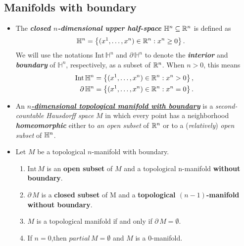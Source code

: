 \documentclass[11pt]{article}
\begin{document}
\subsection{Manifolds with boundary}
\begin{itemize}
\item \begin{definition}
The \emph{\textbf{closed $n$-dimensional upper half-space}} $\mathbb{H}^n \subseteq {\mathbb R}^n$ is defined as
\begin{align*}
\mathbb{H}^n &= \left\{(x^1, \ldots, x^n) \in {\mathbb R}^n: x^n \ge 0\right\}. 
\end{align*} We will use the notations $\text{Int}\, \mathbb{H}^n$ and $\partial\, \mathbb{H}^n$ to denote the \emph{\textbf{interior}} and \emph{\textbf{boundary}} of $\mathbb{H}^n$, respectively, as a subset of ${\mathbb R}^n$. When $n > 0$, this means
\begin{align*}
\text{Int}\, \mathbb{H}^n &= \left\{(x^1, \ldots, x^n) \in {\mathbb R}^n: x^n > 0\right\}, \\
\partial\, \mathbb{H}^n &= \left\{(x^1, \ldots, x^n) \in {\mathbb R}^n: x^n = 0\right\}.
\end{align*}
\end{definition}

\item 
\begin{definition}
An \underline{\emph{\textbf{$n$-dimensional topological manifold with boundary}}} is a \emph{second-countable Hausdorff space} $M$ in which every point has a neighborhood \emph{\textbf{homeomorphic}} either to \emph{an open subset} of ${\mathbb R}^n$ or to a (\emph{relatively}) \emph{open subset} of ${\mathbb H}^n$.
\end{definition}

\item \begin{proposition}
Let $M$ be a topological $n$-manifold with boundary.
\begin{enumerate}
\item $\text{Int}\, M$ is an \textbf{open subset} of $M$ and a topological n-manifold \textbf{without boundary}.
\item $\partial\,M$ is a \textbf{closed subset} of M and a \textbf{topological $(n - 1)$-manifold without boundary}.
\item $M$ is a topological manifold if and only if $\partial\,M = \emptyset$.
\item If $n = 0$,then $partial\,M = \emptyset$ and $M$ is a $0$-manifold.
\end{enumerate}
\end{proposition}


\end{itemize}
\end{document}

